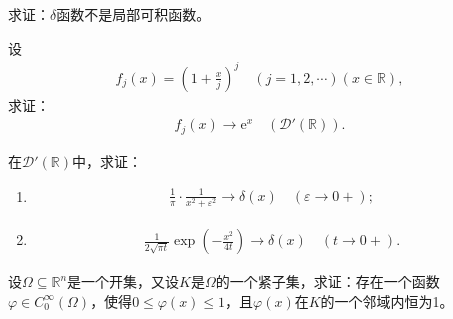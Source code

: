 \documentclass[../../main.tex]{subfiles}%
\begin{document}
\begin{example}
求证：$\delta$函数不是局部可积函数。
\end{example}

\begin{example}
设
\begin{align*}
f_j(x) = \left(1+\frac{x}{j}\right)^j \quad (j=1,2,\cdots)(x\in\mathbb{R}),
\end{align*}
求证：
\begin{align*}
f_j(x) \to \mathrm{e}^x \quad (\mathscr{D}'(\mathbb{R})).
\end{align*}
\end{example}

\begin{example}
在$\mathscr{D}'(\mathbb{R})$中，求证：
\begin{enumerate}[(1)]
\item \begin{align*}
\frac{1}{\pi}\cdot\frac{1}{x^2+\varepsilon^2} \to \delta(x) \quad (\varepsilon\to0+);
\end{align*}
\item \begin{align*}
\frac{1}{2\sqrt{\pi t}}\exp\left(-\frac{x^2}{4t}\right) \to \delta(x) \quad (t\to0+).
\end{align*}
\end{enumerate}
\end{example}

\begin{example}
设$\Omega\subseteq\mathbb{R}^n$是一个开集，又设$K$是$\Omega$的一个紧子集，求证：存在一个函数$\varphi\in C_0^\infty(\Omega)$，使得$0\leqslant\varphi(x)\leqslant1$，且$\varphi(x)$在$K$的一个邻域内恒为1。
\end{example}
\end{document}
